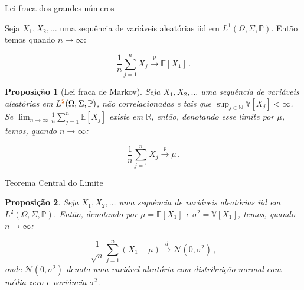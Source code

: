 \documentclass[11pt]{beamer}
\newtheorem{proposition}{Proposição}
\begin{document}
		\begin{frame}{Lei fraca dos grandes números}
			\begin{corollary}
			Seja $X_1, X_2,\ldots$ uma sequência de variáveis aleatórias iid em $L^1(\Omega,\Sigma,\mathbb{P})$. Então temos quando $n \to \infty$:
			
			$$\frac{1}{n}\sum_{j=1}^n X_j \overset{\text{p}}{\to} \mathbb{E}[X_1]\, .$$
		\end{corollary}
		
					\begin{proposition}[Lei fraca de Markov]
			Seja $X_1, X_2,\ldots$ uma sequência de variáveis aleatórias em $L^{\color{red}2}(\Omega,\Sigma,\mathbb{P})$, não correlacionadas e tais que $\sup_{j \in \mathbb{N}}\mathbb{V}[X_j] <\infty$. Se $\lim_{n\to\infty} \frac{1}{n}\sum_{j=1}^n \mathbb{E}[X_j]$ existe em $\mathbb{R}$, então, denotando esse limite por $\mu$, temos, quando $n \to \infty$:
			 
		$$\frac{1}{n}\sum_{j=1}^n X_j \overset{\text{p}}{\to} \mu\, .$$
		\end{proposition}
	\end{frame}
		\begin{frame}{Teorema Central do Limite}
			\begin{proposition}
						Seja $X_1, X_2,\ldots$ uma sequência de variáveis aleatórias iid em $L^2(\Omega,\Sigma,\mathbb{P})$. Então, denotando por $\mu = \mathbb{E}[X_1]$ e $\sigma^2 = \mathbb{V}[X_1]$, temos, quando $n \to \infty$:
						
						
						$$\frac{1}{\sqrt{n}}\sum_{j=1}^n (X_1 - \mu) \overset{d}{\to} \mathcal{N}(0,\sigma^2)\, , $$
						onde $\mathcal{N}(0,\sigma^2)$ denota uma variável aleatória com distribuição normal com média zero e variância $\sigma^2$.
			\end{proposition}

	\end{frame}
\end{document}

